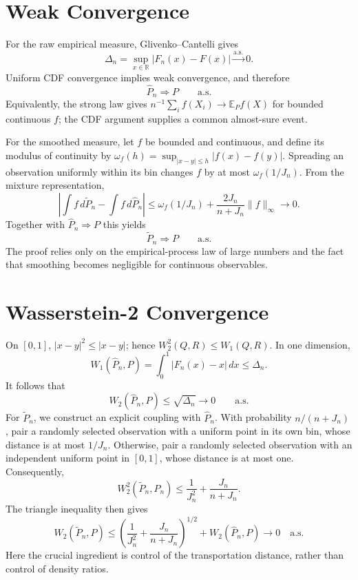 \documentclass[
  11pt,
  a4paper,
  notitlepage
]{report}
\begin{document}
\section{Weak Convergence}\label{weak-convergence-1}

For the raw empirical measure, Glivenko--Cantelli gives \[
\Delta_n=\sup_{x\in\mathbb R}|F_n(x)-F(x)|
\overset{\mathrm{a.s.}}{\longrightarrow}0.
\] Uniform CDF convergence implies weak convergence, and therefore \[
\boxed{\widehat P_n\Rightarrow P\qquad\mathrm{a.s.}}
\] Equivalently, the strong law gives
\(n^{-1}\sum_i f(X_i)\to\mathbb E_Pf(X)\) for bounded continuous \(f\);
the CDF argument supplies a common almost-sure event.

For the smoothed measure, let \(f\) be bounded and continuous, and
define its modulus of continuity by
\(\omega_f(h)=\sup_{|x-y|\le h}|f(x)-f(y)|\). Spreading an observation
uniformly within its bin changes \(f\) by at most \(\omega_f(1/J_n)\).
From the mixture representation, \[
\left|\int f\,d\widetilde P_n-\int f\,d\widehat P_n\right|
\le\omega_f(1/J_n)
+\frac{2J_n}{n+J_n}\|f\|_\infty\longrightarrow0.
\] Together with \(\widehat P_n\Rightarrow P\) this yields \[
\boxed{\widetilde P_n\Rightarrow P\qquad\mathrm{a.s.}}
\] The proof relies only on the empirical-process law of large numbers
and the fact that smoothing becomes negligible for continuous
observables.

\section{Wasserstein-2 Convergence}\label{wasserstein-2-convergence-1}

On \([0,1]\), \(|x-y|^2\le|x-y|\); hence \(W_2^2(Q,R)\le W_1(Q,R)\). In
one dimension, \[
W_1(\widehat P_n,P)=\int_0^1|F_n(x)-x|\,dx
\le\Delta_n.
\] It follows that \[
\boxed{W_2(\widehat P_n,P)\le\sqrt{\Delta_n}
\longrightarrow0\qquad\mathrm{a.s.}}
\] For \(\widetilde P_n\), we construct an explicit coupling with
\(\widehat P_n\). With probability \(n/(n+J_n)\), pair a randomly
selected observation with a uniform point in its own bin, whose distance
is at most \(1/J_n\). Otherwise, pair a randomly selected observation
with an independent uniform point in \([0,1]\), whose distance is at
most one. Consequently, \[
W_2^2(\widetilde P_n,\widehat P_n)
\le\frac1{J_n^2}+\frac{J_n}{n+J_n}.
\] The triangle inequality then gives \[
\boxed{
W_2(\widetilde P_n,P)
\le\left(\frac1{J_n^2}+\frac{J_n}{n+J_n}\right)^{1/2}
+W_2(\widehat P_n,P)\longrightarrow0
\quad\mathrm{a.s.}}
\] Here the crucial ingredient is control of the transportation
distance, rather than control of density ratios.
\end{document}
